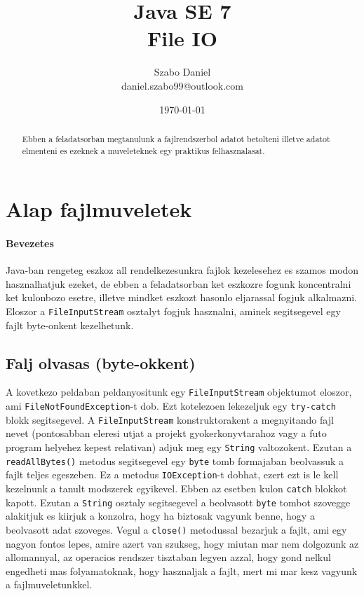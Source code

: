 \documentclass{article}
\title{%
Java SE 7 \\
\large File IO}
\author{Szabo Daniel\\daniel.szabo99@outlook.com}
\date{\today}
\let\l\lstinline
\begin{document}
\maketitle
\begin{abstract}
Ebben a feladatsorban megtanulunk a fajlrendszerbol adatot betolteni illetve adatot elmenteni es ezeknek a muveleteknek egy praktikus felhasznalasat.
\end{abstract}

\newpage

\tableofcontents{}

\newpage

\section{Alap fajlmuveletek}
\paragraph{Bevezetes}

Java-ban rengeteg eszkoz all rendelkezesunkra fajlok kezelesehez es szamos modon hasznalhatjuk ezeket, de ebben a feladatsorban ket eszkozre fogunk koncentralni ket kulonbozo esetre, illetve mindket eszkozt hasonlo eljarassal fogjuk alkalmazni. Eloszor a \l{FileInputStream} osztalyt fogjuk hasznalni, aminek segitsegevel egy fajlt byte-onkent kezelhetunk.

\subsection{Falj olvasas (byte-okkent)}

A kovetkezo peldaban peldanyositunk egy \l{FileInputStream} objektumot eloszor, ami \l{FileNotFoundException}-t dob. Ezt kotelezoen lekezeljuk egy \l{try-catch} blokk segitsegevel. A \l{FileInputStream} konstruktorakent a megnyitando fajl nevet (pontosabban eleresi utjat a projekt gyokerkonyvtarahoz vagy a futo program helyehez kepest relativan) adjuk meg egy \l{String} valtozokent. Ezutan a \l{readAllBytes()} metodus segitsegevel egy \l{byte} tomb formajaban beolvassuk a fajlt teljes egeszeben. Ez a metodus \l{IOException}-t dobhat, ezert ezt is le kell kezelnunk a tanult modszerek egyikevel. Ebben az esetben kulon \l{catch} blokkot kapott. Ezutan a \l{String} osztaly segitsegevel a beolvasott \l{byte} tombot szovegge alakitjuk es kiirjuk a konzolra, hogy ha biztosak vagyunk benne, hogy a beolvasott adat szoveges. Vegul a \l{close()} metodussal bezarjuk a fajlt, ami egy nagyon fontos lepes, amire azert van szukseg, hogy miutan mar nem dolgozunk az allomannyal, az operacios rendszer tisztaban legyen azzal, hogy gond nelkul engedheti mas folyamatoknak, hogy hasznaljak a fajlt, mert mi mar kesz vagyunk a fajlmuveletunkkel.
\end{document}
